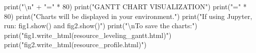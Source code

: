 \documentclass[
  letterpaper,
  DIV=11,
  numbers=noendperiod]{scrreprt}
\newenvironment{Shaded}{\begin{snugshade}}{\end{snugshade}}
\newcommand{\BuiltInTok}[1]{\textcolor[rgb]{0.00,0.23,0.31}{#1}}
\newcommand{\CharTok}[1]{\textcolor[rgb]{0.13,0.47,0.30}{#1}}
\newcommand{\DecValTok}[1]{\textcolor[rgb]{0.68,0.00,0.00}{#1}}
\newcommand{\NormalTok}[1]{\textcolor[rgb]{0.00,0.23,0.31}{#1}}
\newcommand{\OperatorTok}[1]{\textcolor[rgb]{0.37,0.37,0.37}{#1}}
\newcommand{\StringTok}[1]{\textcolor[rgb]{0.13,0.47,0.30}{#1}}
\begin{document}
\begin{Shaded}
\begin{Highlighting}[]
\BuiltInTok{print}\NormalTok{(}\StringTok{"}\CharTok{\textbackslash{}n}\StringTok{"} \OperatorTok{+} \StringTok{"="} \OperatorTok{*} \DecValTok{80}\NormalTok{)}
\BuiltInTok{print}\NormalTok{(}\StringTok{"GANTT CHART VISUALIZATION"}\NormalTok{)}
\BuiltInTok{print}\NormalTok{(}\StringTok{"="} \OperatorTok{*} \DecValTok{80}\NormalTok{)}
\BuiltInTok{print}\NormalTok{(}\StringTok{"Charts will be displayed in your environment."}\NormalTok{)}
\BuiltInTok{print}\NormalTok{(}\StringTok{"If using Jupyter, run: fig1.show() and fig2.show()"}\NormalTok{)}
\BuiltInTok{print}\NormalTok{(}\StringTok{"}\CharTok{\textbackslash{}n}\StringTok{To save the charts:"}\NormalTok{)}
\BuiltInTok{print}\NormalTok{(}\StringTok{"fig1.write\_html(\textquotesingle{}resource\_leveling\_gantt.html\textquotesingle{})"}\NormalTok{)}
\BuiltInTok{print}\NormalTok{(}\StringTok{"fig2.write\_html(\textquotesingle{}resource\_profile.html\textquotesingle{})"}\NormalTok{)}
\end{Highlighting}
\end{Shaded}
\end{document}
